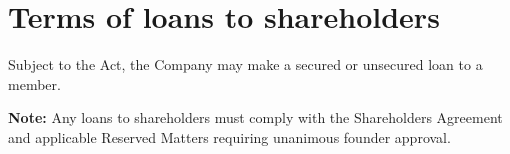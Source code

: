 \section{Terms of loans to shareholders}

Subject to the Act, the Company may make a secured or unsecured loan to a member.

\textbf{Note:} Any loans to shareholders must comply with the Shareholders Agreement and applicable Reserved Matters requiring unanimous founder approval. 